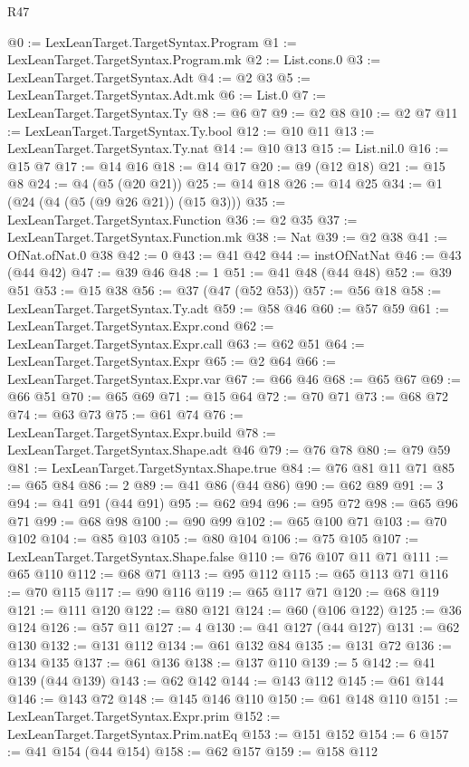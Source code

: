 \begin{lexlean}{R47}
\begin{coremodule}
@0 := LexLeanTarget.TargetSyntax.Program
@1 := LexLeanTarget.TargetSyntax.Program.mk
@2 := List.cons.{0}
@3 := LexLeanTarget.TargetSyntax.Adt
@4 := @2 @3
@5 := LexLeanTarget.TargetSyntax.Adt.mk
@6 := List.{0}
@7 := LexLeanTarget.TargetSyntax.Ty
@8 := @6 @7
@9 := @2 @8
@10 := @2 @7
@11 := LexLeanTarget.TargetSyntax.Ty.bool
@12 := @10 @11
@13 := LexLeanTarget.TargetSyntax.Ty.nat
@14 := @10 @13
@15 := List.nil.{0}
@16 := @15 @7
@17 := @14 @16
@18 := @14 @17
@20 := @9 (@12 @18)
@21 := @15 @8
@24 := @4 (@5 (@20 @21))
@25 := @14 @18
@26 := @14 @25
@34 := @1 (@24 (@4 (@5 (@9 @26 @21)) (@15 @3)))
@35 := LexLeanTarget.TargetSyntax.Function
@36 := @2 @35
@37 := LexLeanTarget.TargetSyntax.Function.mk
@38 := Nat
@39 := @2 @38
@41 := OfNat.ofNat.{0} @38
@42 := 0
@43 := @41 @42
@44 := instOfNatNat
@46 := @43 (@44 @42)
@47 := @39 @46
@48 := 1
@51 := @41 @48 (@44 @48)
@52 := @39 @51
@53 := @15 @38
@56 := @37 (@47 (@52 @53))
@57 := @56 @18
@58 := LexLeanTarget.TargetSyntax.Ty.adt
@59 := @58 @46
@60 := @57 @59
@61 := LexLeanTarget.TargetSyntax.Expr.cond
@62 := LexLeanTarget.TargetSyntax.Expr.call
@63 := @62 @51
@64 := LexLeanTarget.TargetSyntax.Expr
@65 := @2 @64
@66 := LexLeanTarget.TargetSyntax.Expr.var
@67 := @66 @46
@68 := @65 @67
@69 := @66 @51
@70 := @65 @69
@71 := @15 @64
@72 := @70 @71
@73 := @68 @72
@74 := @63 @73
@75 := @61 @74
@76 := LexLeanTarget.TargetSyntax.Expr.build
@78 := LexLeanTarget.TargetSyntax.Shape.adt @46
@79 := @76 @78
@80 := @79 @59
@81 := LexLeanTarget.TargetSyntax.Shape.true
@84 := @76 @81 @11 @71
@85 := @65 @84
@86 := 2
@89 := @41 @86 (@44 @86)
@90 := @62 @89
@91 := 3
@94 := @41 @91 (@44 @91)
@95 := @62 @94
@96 := @95 @72
@98 := @65 @96 @71
@99 := @68 @98
@100 := @90 @99
@102 := @65 @100 @71
@103 := @70 @102
@104 := @85 @103
@105 := @80 @104
@106 := @75 @105
@107 := LexLeanTarget.TargetSyntax.Shape.false
@110 := @76 @107 @11 @71
@111 := @65 @110
@112 := @68 @71
@113 := @95 @112
@115 := @65 @113 @71
@116 := @70 @115
@117 := @90 @116
@119 := @65 @117 @71
@120 := @68 @119
@121 := @111 @120
@122 := @80 @121
@124 := @60 (@106 @122)
@125 := @36 @124
@126 := @57 @11
@127 := 4
@130 := @41 @127 (@44 @127)
@131 := @62 @130
@132 := @131 @112
@134 := @61 @132 @84
@135 := @131 @72
@136 := @134 @135
@137 := @61 @136
@138 := @137 @110
@139 := 5
@142 := @41 @139 (@44 @139)
@143 := @62 @142
@144 := @143 @112
@145 := @61 @144
@146 := @143 @72
@148 := @145 @146 @110
@150 := @61 @148 @110
@151 := LexLeanTarget.TargetSyntax.Expr.prim
@152 := LexLeanTarget.TargetSyntax.Prim.natEq
@153 := @151 @152
@154 := 6
@157 := @41 @154 (@44 @154)
@158 := @62 @157
@159 := @158 @112

\end{coremodule}
\end{lexlean}
